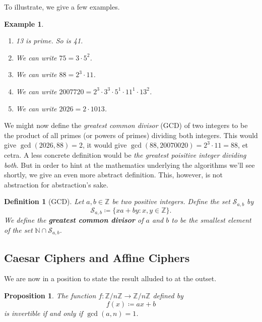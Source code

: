 \documentclass{article}
\newcommand{\blue}[1]{ {\color{blue}{#1}} }
\newcommand{\N}{\mathbb{N}}
\newcommand{\Z}{\mathbb{Z}}
\newcommand{\ess}{\mathcal{S}}
\theoremstyle{plain}
\newtheorem{definition}{Definition}
\newtheorem{example}{Example}
\newtheorem{proposition}{Proposition}
\begin{document}
To illustrate, we give a few examples.

\begin{example}
\begin{enumerate}
    \item 13 is prime. So is 41.
    \item We can write $75 = 3 \cdot 5^2$.
    \item We can write $88 = 2^3 \cdot 11$.
    \item We can write $2007720 = 2^3 \cdot 3^3 \cdot 5^1 \cdot 11^1 \cdot 13^2$.
    \item We can write $2026 = 2 \cdot 1013$.
\end{enumerate}
\end{example}


We might now define the \textit{greatest common divisor} (GCD) of two integers 
to be the product of all primes (or powers of primes) dividing both integers.
This would give $\gcd(2026, 88) = 2$, 
it would give $\gcd(88, 20070020) = 2^3 \cdot 11 = 88$, et cetra.
A less concrete definition would be \textit{the greatest poisitive integer dividing both}.
But in order to hint at the mathematics underlying the algorithms we'll see shortly,
we give an even more abstract definition.
This, however, is not abstraction for abstraction's sake.

\begin{definition}[GCD]
    Let $a,b\in\Z$ be two positive integers.
    Define the set $\ess_{a,b}$ by 
    \[
        \ess_{a,b} \coloneq \{ xa + by : x,y \in\Z \}.
    \]
    We define the \textbf{greatest common divisor} of $a$ and $b$ to be the 
    smallest element of the set $\N \cap \ess_{a,b}$.
\end{definition}









\subsection{Caesar Ciphers and Affine Ciphers}

We are now in a position to state the result alluded to at the outset.

\begin{proposition}
    The function $f: \Z/n\Z \to \Z/n\Z$ defined by 
    \[
        f(x) \coloneq ax + b
    \]
    is invertible if and only if $\gcd(a,n)=1$.
\end{proposition}

\blue{
\begin{proof}
    Todo.
\end{proof}
}
\end{document}
